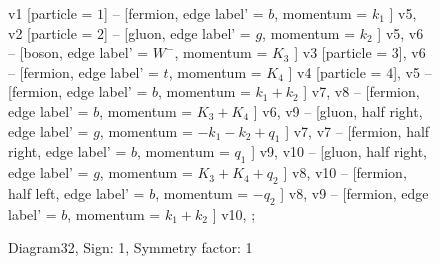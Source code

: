 \documentclass{revtex4}
\begin{document}
\begin{figure}[!htb]
\begin{center}
{    %
v1 [particle = \(1\)] -- [fermion, edge label' = \(b\), momentum = \(k_{1}\) ] v5, 
v2 [particle = \(2\)] -- [gluon, edge label' = \(g\), momentum = \(k_{2}\) ] v5, 
v6 -- [boson, edge label' = \(W^{-}\), momentum = \(K_{3}\) ] v3 [particle = \(3\)], 
v6 -- [fermion, edge label' = \(t\), momentum = \(K_{4}\) ] v4 [particle = \(4\)], 
v5 -- [fermion, edge label' = \(b\), momentum = \(k_{1} + k_{2}\) ] v7, 
v8 -- [fermion, edge label' = \(b\), momentum = \(K_{3} + K_{4}\) ] v6, 
v9 -- [gluon, half right, edge label' = \(g\), momentum = \(-k_{1} - k_{2} + q_{1}\) ] v7, 
v7 -- [fermion, half right, edge label' = \(b\), momentum = \(q_{1}\) ] v9, 
v10 -- [gluon, half right, edge label' = \(g\), momentum = \(K_{3} + K_{4} + q_{2}\) ] v8, 
v10 -- [fermion, half left, edge label' = \(b\), momentum = \(-q_{2}\) ] v8, 
v9 -- [fermion, edge label' = \(b\), momentum = \(k_{1} + k_{2}\) ] v10, 
};
\end{center}
\caption{Diagram32, Sign: 1, Symmetry factor: 1}
\end{figure}
\newpage
\end{document}

